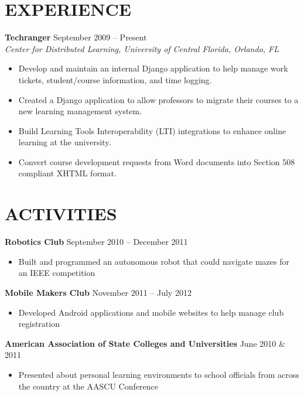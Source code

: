 \documentclass[margin]{res}
\begin{document}
\begin{resume}
\section{EXPERIENCE} 
\textbf{Techranger} \hfill September 2009 -- Present \\
\textit{Center for Distributed Learning, University of Central Florida, Orlando, FL} \smallskip
\begin{itemize}[leftmargin=10pt]
\item Develop and maintain an internal Django application to help manage work tickets, student/course information, and time logging.
\item Created a Django application to allow professors to migrate their courses to a new learning management system.
\item Build Learning Tools Interoperability (LTI) integrations to enhance online learning at the university.
\item Convert course development requests from Word documents into Section 508 compliant XHTML format.
\end{itemize}

\section{ACTIVITIES}             
\textbf{Robotics Club} \hfill September 2010 -- December 2011
\begin{itemize}[leftmargin=10pt]
\itemsep -2pt %
\item Built and programmed an autonomous robot that could navigate mazes for an IEEE competition
\end{itemize}

\textbf{Mobile Makers Club} \hfill November 2011 -- July 2012 
\begin{itemize}[leftmargin=10pt]
\itemsep -2pt %
\item Developed Android applications and mobile websites to help manage club registration
\end{itemize}

\textbf{American Association of State Colleges and Universities} \hfill June 2010 \& 2011
\begin{itemize}[leftmargin=10pt]
\itemsep -2pt %
\item Presented about personal learning environments to school officials from across the country at the AASCU Conference
\end{itemize}


\end{resume}
\end{document}
